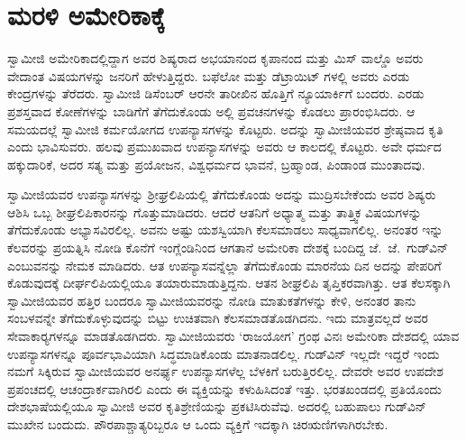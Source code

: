 
\chapter{ಮರಳಿ ಅಮೇರಿಕಾಕ್ಕೆ }

 ಸ್ವಾಮೀಜಿ ಅಮೇರಿಕಾದಲ್ಲಿದ್ದಾಗ ಅವರ ಶಿಷ್ಯರಾದ ಅಭಯಾನಂದ ಕೃಪಾನಂದ ಮತ್ತು ಮಿಸ್ ವಾಲ್ಡೊ ಅವರು ವೇದಾಂತ ವಿಷಯಗಳನ್ನು ಜನರಿಗೆ ಹೇಳುತ್ತಿದ್ದರು. ಬಫೆಲೋ ಮತ್ತು ಡೆಟ್ರಾಯಿಟ್ ಗಳಲ್ಲಿ ಅವರು ಎರಡು ಕೇಂದ್ರಗಳನ್ನು ತೆರೆದರು. ಸ್ವಾಮೀಜಿ ಡಿಸೆಂಬರ್ ಆರನೇ ತಾರೀಖಿನ ಹೊತ್ತಿಗೆ ನ್ಯೂಯಾರ್ಕಿಗೆ ಬಂದರು. ಎರಡು ಪ್ರಶಸ್ತವಾದ ಕೋಣೆಗಳನ್ನು ಬಾಡಿಗೆಗೆ ತೆಗೆದುಕೊಂಡು ಅಲ್ಲಿ ಪ್ರವಚನಗಳನ್ನು ಕೊಡಲು ಪ್ರಾರಂಭಿಸಿದರು. ಆ ಸಮಯದಲ್ಲೆ ಸ್ವಾಮೀಜಿ ಕರ್ಮಯೋಗದ ಉಪನ್ಯಾಸಗಳನ್ನು ಕೊಟ್ಟರು. ಅದನ್ನು ಸ್ವಾಮೀಜಿಯವರ ಶ್ರೇಷ್ಠವಾದ ಕೃತಿ ಎಂದು ಭಾವಿಸುವರು. ಹಲವು ಪ್ರಮುಖವಾದ ಉಪನ್ಯಾಸಗಳನ್ನು ಅವರು ಆ ಕಾಲದಲ್ಲಿ ಕೊಟ್ಟರು. ಅವೇ ಧರ್ಮದ ಹಕ್ಕುದಾರಿಕೆ, ಅದರ ಸತ್ಯ ಮತ್ತು ಪ್ರಯೋಜನ, ವಿಶ್ವಧರ್ಮದ ಭಾವನೆ, ಬ್ರಹ್ಮಾಂಡ, ಪಿಂಡಾಂಡ ಮುಂತಾದವು. 

\vskip 3pt

 ಸ್ವಾಮೀಜಿಯವರ ಉಪನ್ಯಾಸಗಳನ್ನು ಶ‍್ರೀಘ್ರಲಿಪಿಯಲ್ಲಿ ತೆಗೆದುಕೊಂಡು ಅದನ್ನು ಮುದ್ರಿಸಬೇಕೆಂದು ಅವರ ಶಿಷ್ಯರು ಆಶಿಸಿ ಒಬ್ಬ ಶೀಘ್ರಲಿಪಿಕಾರನನ್ನು ಗೊತ್ತುಮಾಡಿದರು. ಆದರೆ ಆತನಿಗೆ ಅಧ್ಯಾತ್ಮ ಮತ್ತು ತಾತ್ತ್ವಿಕ ವಿಷಯಗಳನ್ನು ತೆಗೆದುಕೊಂಡು ಅಭ್ಯಾಸವಿರಲಿಲ್ಲ. ಅವನು ಅಷ್ಟು ಯಶಸ್ವಿಯಾಗಿ ಕೆಲಸಮಾಡಲು ಸಾಧ್ಯವಾಗಲಿಲ್ಲ. ಅನಂತರ ಇನ್ನು ಕೆಲವರನ್ನು ಪ್ರಯತ್ನಿಸಿ ನೋಡಿ ಕೊನೆಗೆ ಇಂಗ್ಲೆಂಡಿನಿಂದ ಆಗತಾನೆ ಅಮೇರಿಕಾ ದೇಶಕ್ಕೆ ಬಂದಿದ್ದ ಜೆ.~ಜೆ.~ಗುಡ್‍ವಿನ್ ಎಂಬುವನನ್ನು ನೇಮಕ ಮಾಡಿದರು. ಆತ ಉಪನ್ಯಾಸವನ್ನೆಲ್ಲಾ ತೆಗೆದುಕೊಂಡು ಮಾರನೆಯ ದಿನ ಅದನ್ನು ಪೇಪರಿಗೆ ಕೊಡುವುದಕ್ಕೆ ದೀರ್ಘಲಿಪಿಯಲ್ಲಿಯೂ ತಯಾರುಮಾಡುತ್ತಿದ್ದನು. ಆತನ ಶೀಘ್ರಲಿಪಿ ತೃಪ್ತಿಕರವಾಗಿತ್ತು. ಆತ ಕೆಲಸಕ್ಕಾಗಿ ಸ್ವಾಮೀಜಿಯವರ ಹತ್ತಿರ ಬಂದರೂ ಸ್ವಾಮೀಜಿಯವರನ್ನು ನೋಡಿ ಮಾತುಕತೆಗಳನ್ನು ಕೇಳಿ, ಅನಂತರ ತಾನು ಸಂಬಳವನ್ನೇ ತೆಗೆದುಕೊಳ್ಳುವುದನ್ನು ಬಿಟ್ಟು ಉಚಿತವಾಗಿ ಕೆಲಸಮಾಡತೊಡಗಿದನು. ಇದು ಮಾತ್ರವಲ್ಲದೆ ಅವರ ಸೇವಾಕಾರ‍್ಯಗಳನ್ನೂ ಮಾಡತೊಡಗಿದರು. ಸ್ವಾಮೀಜಿಯವರು ‘ರಾಜಯೋಗ’ ಗ್ರಂಥ ವಿನಃ ಅಮೇರಿಕಾ ದೇಶದಲ್ಲಿ ಯಾವ ಉಪನ್ಯಾಸಗಳನ್ನೂ ಪೂರ್ವಭಾವಿಯಾಗಿ ಸಿದ್ಧಮಾಡಿಕೊಂಡು ಮಾತನಾಡಲಿಲ್ಲ. ಗುಡ್‍ವಿನ್ ಇಲ್ಲದೇ ಇದ್ದರೆ ಇಂದು ನಮಗೆ ಸಿಕ್ಕಿರುವ ಸ್ವಾಮೀಜಿಯವರ ಅನರ್ಘ್ಯ ಉಪನ್ಯಾಸಗಳೆಲ್ಲ ಬೆಳಕಿಗೆ ಬರುತ್ತಿರಲಿಲ್ಲ. ದೇವರೇ ಅವರ ಉಪದೇಶ ಪ್ರಪಂಚದಲ್ಲಿ ಆಚಂದ್ರಾರ್ಕವಾಗಿರಲಿ ಎಂದು ಈ ವ್ಯಕ್ತಿಯನ್ನು ಕಳುಹಿಸಿದಂತೆ ಇತ್ತು. ಭರತಖಂಡದಲ್ಲಿ ಪ್ರತಿಯೊಂದು ದೇಶಭಾಷೆಯಲ್ಲಿಯೂ ಸ್ವಾಮೀಜಿ ಅವರ ಕೃತಿಶ್ರೇಣಿಯನ್ನು ಪ್ರಕಟಿಸಿರುವೆವು. ಅದರಲ್ಲಿ ಬಹುಪಾಲು ಗುಡ್‍ವಿನ್ ಮುಖೇನ ಬಂದುದು. ಪೌರಪಾಶ್ಚಾತ್ಯರಿಬ್ಬರೂ ಆ ಒಂದು ವ್ಯಕ್ತಿಗೆ ಇದಕ್ಕಾಗಿ ಚಿರಋಣಿಗಳಾಗಿರಬೇಕು. 

\vskip 3pt

